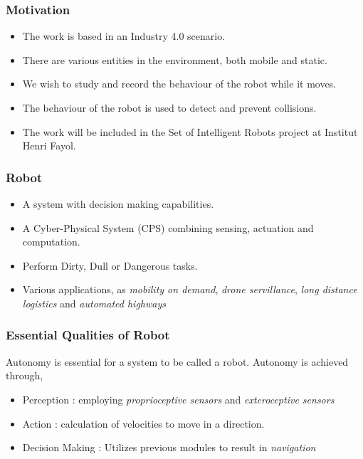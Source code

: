 \documentclass{beamer}
\begin{document}
\begin{frame}
    \frametitle{Motivation}
    \begin{itemize}
        \item The work is based in an Industry 4.0 scenario.
        \item There are various entities in the environment, both mobile and static.
        \item We wish to study and record the behaviour of the robot while it moves.
        \item The behaviour of the robot is used to detect and prevent collisions.
        \item The work will be included in the Set of Intelligent Robots project at Institut Henri Fayol.
    \end{itemize}
\end{frame}

\begin{frame}
    \frametitle{Robot}
    \begin{itemize}
        \item  A system with decision making capabilities.
        \item  A Cyber-Physical System (CPS) combining sensing, actuation and computation.
        \item  Perform Dirty, Dull or Dangerous tasks.
        \item  Various applications, as \textit{mobility on demand}, \textit{drone servillance}, \textit{long distance logistics} and \textit{automated highways}
    \end{itemize}
\end{frame}

\begin{frame}
    \frametitle{Essential Qualities of Robot}
    Autonomy is essential for a system to be called a robot.
    Autonomy is achieved through,
    \begin{itemize}
        \item Perception \label{Perception} : employing \textit{proprioceptive sensors} and \textit{exteroceptive sensors}
        \item Action \label{Action} : calculation of velocities to move in a direction.
        \item Decision Making : Utilizes previous modules to result in \textit{navigation}
    \end{itemize}
\end{frame}
\end{document}
